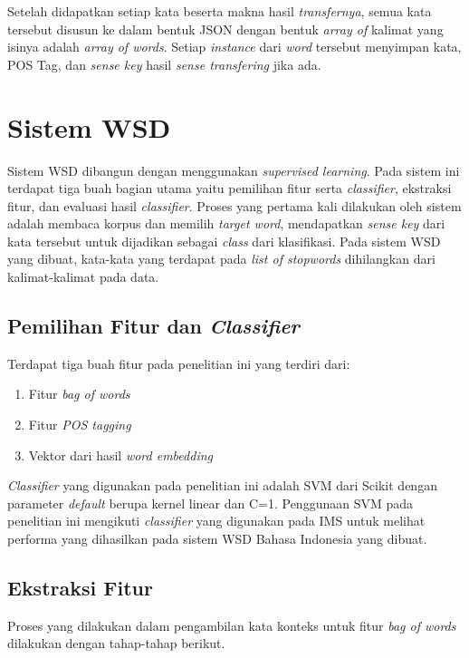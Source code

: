 Setelah didapatkan setiap kata beserta makna hasil \textit{transfernya}, semua kata tersebut disusun ke dalam bentuk JSON dengan bentuk \textit{array of} kalimat yang isinya adalah \textit{array of words}. Setiap \textit{instance} dari \textit{word} tersebut menyimpan kata, POS Tag, dan \textit{sense key} hasil \textit{sense transfering} jika ada.
\section{Sistem WSD}
Sistem WSD dibangun dengan menggunakan \textit{supervised learning}. Pada sistem ini terdapat tiga buah bagian utama yaitu pemilihan fitur serta \textit{classifier}, ekstraksi fitur, dan evaluasi hasil \textit{classifier}. Proses yang pertama kali dilakukan oleh sistem adalah membaca korpus dan memilih \textit{target word}, mendapatkan \textit{sense key} dari kata tersebut untuk dijadikan sebagai \textit{class} dari klasifikasi. Pada sistem WSD yang dibuat, kata-kata yang terdapat pada \textit{list of stopwords} dihilangkan dari kalimat-kalimat pada data.

\subsection{Pemilihan Fitur dan \textit{Classifier}}
Terdapat tiga buah fitur pada penelitian ini yang terdiri dari:

\begin{enumerate}
	\item Fitur \textit{bag of words}
	\item Fitur \textit{POS tagging}
	\item Vektor dari hasil \textit{word embedding}
\end{enumerate}

\textit{Classifier} yang digunakan pada penelitian ini adalah SVM dari Scikit \citep{scikit-learn} dengan parameter \textit{default} berupa kernel linear dan C=1. Penggunaan SVM pada penelitian ini mengikuti \textit{classifier} yang digunakan pada IMS \cite{zhong2010makes} untuk melihat performa yang dihasilkan pada sistem WSD Bahasa Indonesia yang dibuat.

\subsection{Ekstraksi Fitur}
Proses yang dilakukan dalam pengambilan kata konteks untuk fitur \textit{bag of words} dilakukan dengan tahap-tahap berikut.

